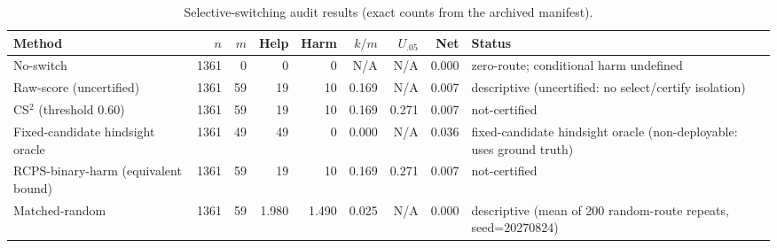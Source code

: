 \begin{table}[t]
\centering
\caption{Selective-switching audit results (exact counts from the archived manifest).}
\label{tab:cs2_main}
\begin{tabular}{lrrrrrrrl}
\toprule
Method & $n$ & $m$ & Help & Harm & $k/m$ & $U_{.05}$ & Net & Status \\
\midrule
No-switch & 1361 & 0 & 0 & 0 & N/A & N/A & 0.000 & zero-route; conditional harm undefined \\
Raw-score (uncertified) & 1361 & 59 & 19 & 10 & 0.169 & N/A & 0.007 & descriptive (uncertified: no select/certify isolation) \\
CS$^2$ (threshold 0.60) & 1361 & 59 & 19 & 10 & 0.169 & 0.271 & 0.007 & not-certified \\
Fixed-candidate hindsight oracle & 1361 & 49 & 49 & 0 & 0.000 & N/A & 0.036 & fixed-candidate hindsight oracle (non-deployable: uses ground truth) \\
RCPS-binary-harm (equivalent bound) & 1361 & 59 & 19 & 10 & 0.169 & 0.271 & 0.007 & not-certified \\
Matched-random & 1361 & 59 & 1.980 & 1.490 & 0.025 & N/A & 0.000 & descriptive (mean of 200 random-route repeats, seed=20270824) \\
\bottomrule
\end{tabular}
\end{table}
